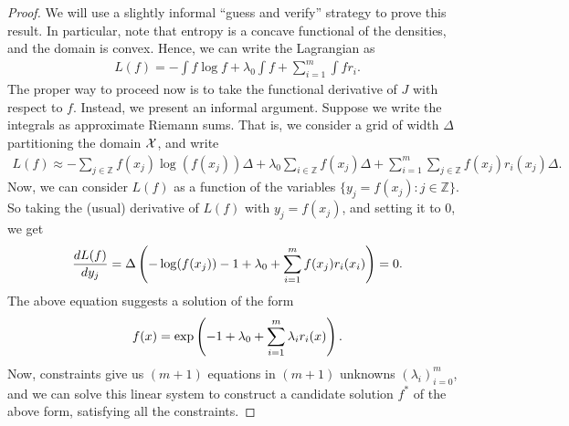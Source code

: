         \begin{proof}
            We will use a slightly informal ``guess and verify'' strategy to prove this result. In particular, note that entropy is a concave functional of the densities, and the domain is convex. Hence, we can write the Lagrangian as 
            \begin{align}
                L(f) = - \int f \log f + \lambda_0 \int f + \sum_{i=1}^m \int f r_i.   
            \end{align}
            The proper way to proceed now is to take the functional derivative of $J$ with respect to $f$.  Instead, we present an informal argument. Suppose we write the integrals as approximate Riemann sums. That is, we consider a grid of width $\Delta$ partitioning the domain $\mathcal{X}$, and write 
            \begin{align}
                L(f) \approx - \sum_{j \in \mathbb{Z}} f(x_j) \log(f(x_j)) \Delta + \lambda_0 \sum_{i \in \mathbb{Z}} f(x_j) \Delta + \sum_{i=1}^m  \sum_{j \in \mathbb{Z}} f(x_j) r_i(x_j) \Delta. 
            \end{align}
            Now, we can consider $L(f)$ as a function of the variables $\{y_j = f(x_j): j \in \mathbb{Z} \}$. So taking the (usual) derivative of $L(f)$ with $y_j = f(x_j)$, and setting it to $0$,  we get 
            \begin{align}
                \frac{dL(f)}{dy_j} = \Delta \left(  - \log(f(x_j)) - 1 + \lambda_0 + \sum_{i=1}^m f(x_j) r_i(x_i)  \right)  = 0. 
            \end{align}
            The above equation suggests a solution of the form 
            \begin{align}
                f(x) = \exp \left( -1 + \lambda_0 + \sum_{i=1}^m \lambda_i r_i(x) \right). 
            \end{align}
            Now, constraints give us $(m+1)$ equations in $(m+1)$ unknowns $(\lambda_i)_{i=0}^m$, and we can solve this linear system to construct a candidate solution $f^*$ of the above form, satisfying all the constraints. 



\end{proof}
